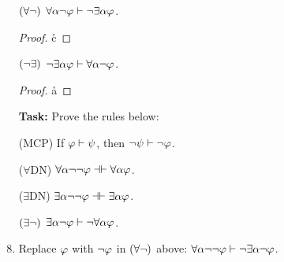 \documentclass[a4paper, 11pt]{article} %
\begin{document}
\begin{enumerate}
  \item[$(\forall\neg)$] $\forall \alpha\neg\varphi \vdash \neg\exists \alpha\varphi$.
    \begin{proof}
            \pr{}
        \open
                  
            \open
                
                \open
                    
                    \r{c}
                    
                \close
                
            \close
            
        \close
             
    \end{proof}
  \item[$(\neg\exists)$] $\neg\exists \alpha\varphi \vdash \forall \alpha\neg\varphi$.
    \begin{proof}
            \pr{}
        \open
                
                 
            \r{a}
        \close
           
             
    \end{proof}
  \item[\bf Task:] Prove the rules below: 
  \item[(MCP)] If $\varphi\vdash\psi$, then $\neg\psi\vdash\neg\varphi$.
  \item[($\forall$DN)] $\forall\alpha\neg\neg\varphi\dashv\vdash\forall\alpha\varphi$.
  \item[($\exists$DN)] $\exists\alpha\neg\neg\varphi\dashv\vdash\exists\alpha\varphi$.
  \item[$(\exists\neg)$] $\exists \alpha\neg\varphi \vdash \neg\forall \alpha\varphi$.
    \item Replace $\varphi$ with $\neg \varphi$ in $(\forall\neg)$ above: $\forall \alpha \neg\neg \varphi \vdash \neg \exists \alpha\neg \varphi$. 

\end{enumerate}
\end{document}
